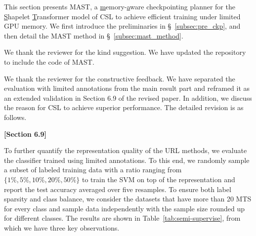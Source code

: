 \begin{sloppypar}
\begin{framed}
    This section presents \textsf{MAST}, a \underline{m}emory-\underline{a}ware checkpointing planner for the \underline{S}hapelet \underline{T}ransformer model of CSL to achieve efficient training under limited GPU memory.  We first introduce the preliminaries in \S~\ref{subsec:pre_ckp}, and then detail the MAST method in \S~\ref{subsec:mast_method}.
\end{framed}



We thank the reviewer for the kind suggestion. We have updated the repository to include the code of MAST. 


We thank the reviewer for the constructive feedback. We have separated the evaluation with limited annotations from the main result part and reframed it as an extended validation in Section 6.9 of the revised paper. In addition, we discuss the reason for CSL to achieve superior performance. The detailed revision is as follows.

\begin{framed}
\textbf{[Section 6.9]}

 
To further quantify the representation quality of the URL methods, we evaluate the classifier trained using limited annotations. To this end, we randomly sample a subset of labeled training data with a ratio ranging from $\{1\%,5\%,10\%,20\%,50\%\}$ to train the SVM on top of the representation and report the test accuracy averaged over five resamples. To ensure both label sparsity and class balance, we consider the datasets that have more than 20 MTS for every class and sample data independently with the sample size rounded up for different classes. The results are shown in Table~\ref{tab:semi-supervise}, from which we have three key observations.


\end{framed}
\end{sloppypar}
